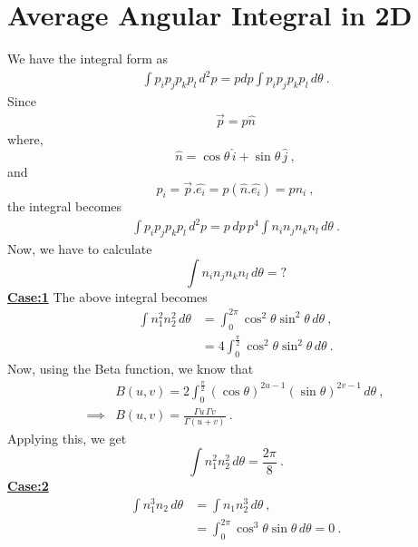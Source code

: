 \documentclass[amsmath,amssymb,aps,prb]{revtex4-2}
\begin{document}
    \section{Average Angular Integral in 2D}
    \label{App_D}
    We have the integral form as
    \begin{align*}
    \int p_i p_j p_k p_l \, d^2p = p dp \int  p_i p_j p_k p_l \,d\theta~.
    \end{align*}
    Since
    \begin{align*}
    \Vec{p} = p \hat{n}
    \end{align*}
    where, $$ \hat{n} = \cos{\theta}\,\hat{i} + \sin{\theta}\, \hat{j}~, $$
    and
    $$ p_i = \Vec{p}.\hat{e_i} = p \left(\hat{n}.\hat{e_i}\right) = pn_i~, $$
    the integral becomes
    \begin{align*}
     \int p_i p_j p_k p_l \, d^2p = p\,dp \, p^4 \int  n_i n_j n_k n_l \,d\theta~.
    \end{align*}
    Now, we have to calculate
    $$ \int  n_i n_j n_k n_l \,d\theta = ? $$
    \underline{\textbf{Case:1}} %
    The above integral becomes
    \begin{align*}
    \int n_1^2 n_2^2\, d\theta &= \int_0^{2 \pi} \cos^2{\theta} \sin^2{\theta} \, d\theta~,\\
    & = 4  \int_0^{ \frac{\pi}{2}} \cos^2{\theta} \sin^2{\theta} \, d\theta~.
    \end{align*}
    Now, using the Beta function, we know that
    \begin{align}
   & B\left( u, v\right) = 2 \int_0^{\frac{\pi}{2}} \left(\cos{\theta}\right)^{2u-1}\left( \sin{\theta}\right)^{2v-1} \, d\theta~,\\
   \implies & B\left( u, v\right) = \frac{\Gamma u\, \Gamma v}{\Gamma\left(u+v\right)}~.
    \end{align}
    Applying this, we get
    \begin{equation}
    \int n_1^2 n_2^2\, d\theta = \frac{2 \pi}{8}~.
    \end{equation}
    \underline{\textbf{Case:2}}%
    \begin{align*}
    \int n_1^3 n_2\, d\theta &= \int n_1 n_2^3\, d\theta~,\\
    & = \int_0^{2 \pi} \cos^3{\theta} \sin{\theta} \, d\theta = 0~.
    \end{align*}
\end{document}
